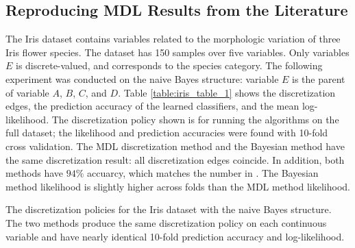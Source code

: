 \documentclass[twoside,11pt]{article}
\newcommand{\citet}[1]{\citeauthor{#1} \citeyear{#1}}
\begin{document}
\subsection*{Reproducing MDL Results from the Literature}

The Iris dataset contains variables related to the morphologic variation of three Iris flower species.
The dataset has \num{150} samples over five variables.
Only variables $E$ is discrete-valued, and corresponds to the species category.
The following experiment was conducted on the naive Bayes structure: variable $E$ is the parent of variable $A$, $B$, $C$, and $D$. Table \ref{table:iris_table_1} shows the discretization edges, the prediction accuracy of the learned classifiers, and the mean log-likelihood.
The discretization policy shown is for running the algorithms on the full dataset; the likelihood and prediction accuracies were found with 10-fold cross validation.
The MDL discretization method and the Bayesian method have the same discretization result: all discretization edges coincide. In addition, both methods have $94 \%$ accuarcy, which matches the number in \citet{Friedman_1996}.
The Bayesian method likelihood is slightly higher across folds than the MDL method likelihood.

\begin{table}[ht]
  \centering
  \caption{
    The discretization policies for the Iris dataset with the naive Bayes structure.
    The two methods produce the same discretization policy on each continuous variable and have nearly identical 10-fold prediction accuracy and log-likelihood.
  }

  \label{table:iris_table_1}
\end{table}


\vskip 0.2in


\end{document}
